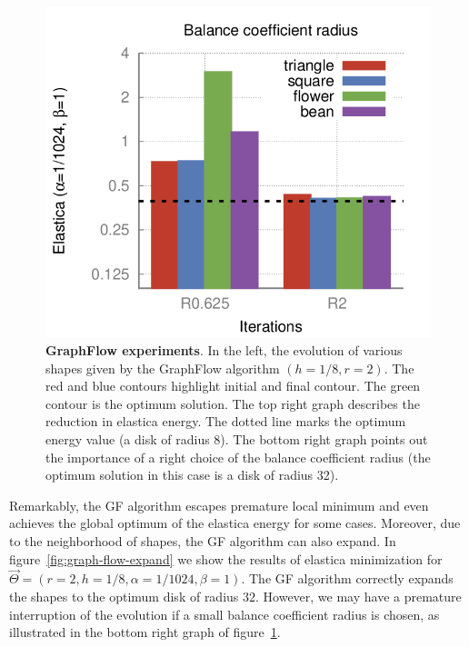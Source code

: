 \documentclass[smallextended]{svjour3}
\begin{document}
\begin{figure}
\begin{minipage}{0.75\textwidth}
\includegraphics[scale=0.22]{figures/shape-flow/plots/bars.png}
\end{minipage}
\caption{\textbf{GraphFlow experiments}. In the left, the evolution of various shapes given by the GraphFlow algorithm $(h=1/8,r=2)$. The red and blue contours highlight initial and final contour. The green contour is the optimum solution. The top right graph describes the reduction in elastica energy. The dotted line marks the optimum energy value (a disk of radius $8$). The bottom right graph points out the importance of a right choice of the balance coefficient radius (the optimum solution in this case is a disk of radius 32).}
\label{fig:graph-flow-experiments}
\end{figure}

Remarkably, the GF algorithm escapes premature local minimum and even achieves the global optimum of the elastica energy for some cases. Moreover, due to the neighborhood of shapes, the GF algorithm can also expand. In figure~\ref{fig:graph-flow-expand} we show the results of elastica minimization for $\vec{\Theta} = ( r=2,h=1/8,\alpha=1/1024,\beta=1 )$. The GF algorithm correctly expands the shapes to the optimum disk of radius $32$. However, we may have a premature interruption of the evolution if a small balance coefficient radius is chosen, as illustrated in the bottom right graph of figure~\ref{fig:graph-flow-experiments}.
\end{document}
